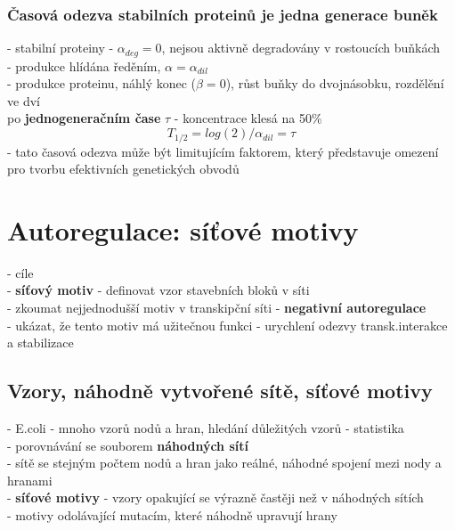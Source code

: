 \documentclass[11pt,a4paper]{report}
\begin{document}
\subsection{Časová odezva stabilních proteinů je jedna generace buněk}
- stabilní proteiny - $\alpha_{deg}=0$, nejsou aktivně degradovány v rostoucích buňkách\\
\indent - produkce hlídána ředěním, $\alpha=\alpha_{dil}$\\
- produkce proteinu, náhlý konec ($\beta=0$), růst buňky do dvojnásobku, rozdělění ve dví\\
\indent po \textbf{jednogeneračním čase} $\tau$ - koncentrace klesá na 50\%\\
\begin{equation}
T_{1/2}=log(2)/\alpha_{dil}=\tau
\end{equation}
- tato časová odezva může být limitujícím faktorem, který představuje omezení pro tvorbu efektivních genetických obvodů\\


\chapter{Autoregulace: síťové motivy}
- cíle \\
\indent - \textbf{síťový motiv} - definovat vzor stavebních bloků v síti\\
\indent - zkoumat nejjednodušší motiv v transkipční síti - \textbf{negativní autoregulace}\\
\indent - ukázat, že tento motiv má užitečnou funkci - urychlení odezvy transk.interakce a stabilizace\\

\section{Vzory, náhodně vytvořené sítě, síťové motivy}
- E.coli - mnoho vzorů nodů a hran, hledání důležitých vzorů - statistika\\
\indent - porovnávání se souborem \textbf{náhodných sítí} \\
\indent \indent - sítě se stejným počtem nodů a hran jako reálné, náhodné spojení mezi nody a hranami\\
- \textbf{síťové motivy} - vzory opakující se výrazně častěji než v náhodných sítích\\ 
\indent - motivy odolávající mutacím, které náhodně upravují hrany\\
\end{document}
